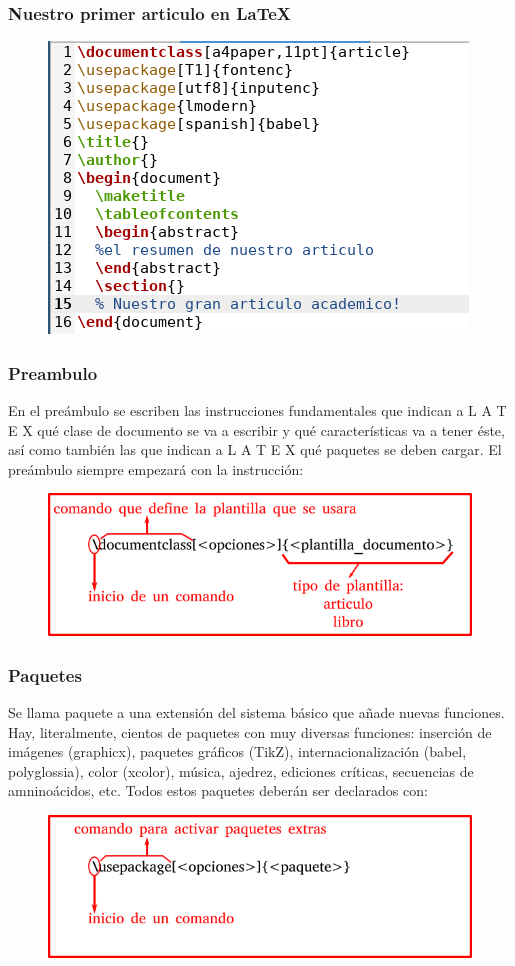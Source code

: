 \documentclass{beamer}
\begin{document}
\begin{frame}
\frametitle{Nuestro primer articulo en \LaTeX{} }
  \begin{figure}
    \includegraphics[width=0.8\linewidth]{img/latex1_texto.png}
  \end{figure}
\end{frame}

\begin{frame}
\frametitle{Preambulo}
En el preámbulo se escriben las instrucciones fundamentales que indican a L A T E X qué clase de documento se va a escribir y qué características va a tener éste, así como también las que indican a L A T E X qué paquetes se deben cargar. El preámbulo siempre empezará con la instrucción:
  \begin{figure}
    \includegraphics[width=0.8\linewidth]{img/instruccion.png}
  \end{figure}
\end{frame}
\begin{frame}
\frametitle{Paquetes}
Se llama paquete a una extensión del sistema básico que añade nuevas funciones. Hay, literalmente, cientos de paquetes con muy diversas funciones: inserción de imágenes (graphicx), paquetes gráficos (TikZ), internacionalización (babel, polyglossia), color (xcolor), música, ajedrez, ediciones críticas, secuencias de amninoácidos, etc. Todos estos paquetes deberán ser declarados con: 
  \begin{figure}
    \includegraphics[width=0.8\linewidth]{img/instruccion2.png}
  \end{figure}
\end{frame}
\end{document}

